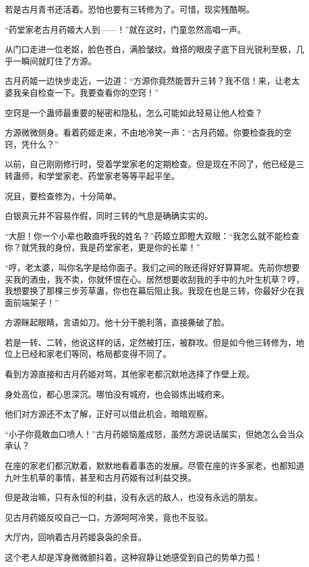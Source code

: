 \begin{this_body}
若是古月青书还活着。恐怕也要有三转修为了。可惜，现实残酷啊。

“药堂家老古月药姬大人到——！”就在这时，门童忽然高唱一声。

从门口走进一位老妪，脸色苍白，满脸皱纹。耸搭的眼皮子底下目光锐利至极，几乎一瞬间就盯住了方源。

古月药姬一边快步走近，一边道：“方源你竟然能晋升三转？我不信！来，让老太婆我亲自检查一下。我要查看你的空窍！”

空窍是一个蛊师最重要的秘密和隐私，怎么可能如此轻易让他人检查？

方源微微侧身。看着药姬走来，不由地冷笑一声：“古月药姬。你要检查我的空窍，凭什么？”

以前，自己刚刚修行时，受着学堂家老的定期检查。但是现在不同了，他已经是三转蛊师，和学堂家老、药堂家老等等平起平坐。

况且，要检查修为，十分简单。

白银真元并不容易作假，同时三转的气息是确确实实的。

“大胆！你一个小辈也敢直呼我的姓名？”药姬立即瞪大双眼：“我怎么就不能检查你？就凭我的身份，我是药堂家老，更是你的长辈！”

“哼，老太婆，叫你名字是给你面子。我们之间的账还得好好算算呢。先前你想要买我的酒虫，我不卖，你就怀恨在心。居然想要收刮我的手中的九叶生机草？哼，我想要换了那棵三步芳草蛊，你也在幕后阻止我。我现在也是三转，你最好少在我面前端架子！”

方源眯起眼睛，言语如刀。他十分干脆利落，直接撕破了脸。

若是一转、二转，他说这样的话，定然被打压，被群攻。但是如今他三转修为，地位上已经和家老们等同，格局都变得不同了。

看到方源直接和古月药姬对骂，其他家老都沉默地选择了作壁上观。

身处高位，都心思深沉。哪怕没有城府，也会锻炼出城府来。

他们对方源还不太了解，正好可以借此机会，暗暗观察。

“小子你竟敢血口喷人！”古月药姬恼羞成怒，虽然方源说话属实，但她怎么会当众承认？

在座的家老们都沉默着，默默地看着事态的发展。尽管在座的许多家老，也都知道九叶生机草的事情，甚至和古月药姬有过利益交换。

但是政治嘛，只有永恒的利益，没有永远的敌人，也没有永远的朋友。

见古月药姬反咬自己一口，方源呵呵冷笑，竟也不反驳。

大厅内，回响着古月药姬袅袅的余音。

这个老人却是浑身微微颤抖着，这种寂静让她感受到自己的势单力孤！


\end{this_body}
